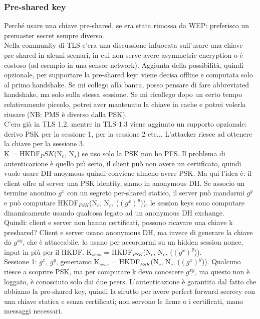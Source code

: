 \documentclass[16px]{article}
\begin{document}
\subsubsection{Pre-shared key}
Perché usare una chiave pre-shared, se era stata rimossa da WEP: preferisco un premaster secret sempre diverso.\\ Nella community di TLS c'era una discussione infuocata sull'usare una chiave pre-shared in alcuni scenari, in cui non serve avere asymmetric encryption o è costoso (ad esempio in una sensor network). Aggiunta della possibilità, quindi opzionale, per supportare la pre-shared key: viene decisa offline e computata solo al primo handshake. Se mi collego alla banca, posso pensare di fare abbreviated handshake, ma solo sulla stessa sessione. Se mi ricollego dopo un certo tempo relativamente piccolo, potrei aver mantenuto la chiave in cache e potrei volerla riusare (NB: PMS è diverso dalla PSK).\\ C'era già in TLS 1.2, mentre in TLS 1.3 viene aggiunto un supporto opzionale: derivo PSK per la sessione 1, per la sessione 2 etc... L'attacker riesce ad ottenere la chiave per la sessione 3.\\ K = HKDF$_PSK$(N$_c$, N$_s$) se uso solo la PSK non ho PFS. Il problema di autenticazione è quello più serio, il client può non avere un certificato, quindi vuole usare DH anoymous quindi conviene almeno avere PSK. Ma qui l'idea è: il client offre al server una PSK identity, siamo in anonymous DH. Se associo un termine anonimo $g^x$ con un segreto per-shared statico, il server può mandarmi $g^y$ e può computare HKDF$_{PSK}$(N$_c$, N$_c$, ($(g^x)^y$)), le session keys sono computare dinamicamente usando qualcosa legato ad un anonymous DH exchange.\\ Quindi: client e server non hanno certificati, possono ricavare una chiave k preshared? Client e server usano anonymous DH, ma invece di generare la chiave da $g^{xy}$, che è attaccabile, lo usano per accordarmi su un hidden session nonce, input in più per il HKDF. K$_{sess}$ = HKDF$_{PSK}$(N$_c$, N$_c$, ($(g^x)^y$)).\\ Sessione 1: $g^x$, $g^y$, generiamo K$_{sess}$ = HKDF$_{PSK}$(N$_c$, N$_c$, ($(g^x)^y$)). Qualcuno riesce a scoprire PSK, ma per computare k devo conoscere $g^{xy}$, ma questo non è loggato, è conosciuto solo dai due peers. L'autenticazione è garantita dal fatto che abbiamo la pre-shared key, quindi la sfrutto per avere perfect forward secrecy con una chiave statica e senza certificati; non servono le firme o i certificati, mano messaggi necessari.
\end{document}
